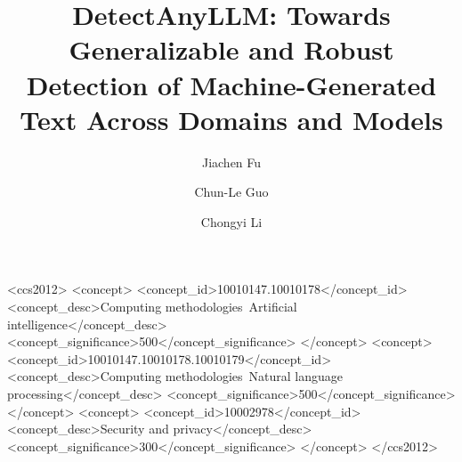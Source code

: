 \documentclass[sigconf]{acmart}
\begin{document}
\title{DetectAnyLLM: Towards Generalizable and Robust Detection of Machine-Generated Text Across Domains and Models}



\author{Jiachen Fu}

\author{Chun-Le Guo}

\author{Chongyi Li}

\renewcommand{\shortauthors}{Fu et al.}

\begin{CCSXML}
<ccs2012>
   <concept>
       <concept_id>10010147.10010178</concept_id>
       <concept_desc>Computing methodologies~Artificial intelligence</concept_desc>
       <concept_significance>500</concept_significance>
       </concept>
   <concept>
       <concept_id>10010147.10010178.10010179</concept_id>
       <concept_desc>Computing methodologies~Natural language processing</concept_desc>
       <concept_significance>500</concept_significance>
       </concept>
   <concept>
       <concept_id>10002978</concept_id>
       <concept_desc>Security and privacy</concept_desc>
       <concept_significance>300</concept_significance>
       </concept>
 </ccs2012>
\end{CCSXML}


\end{document}
